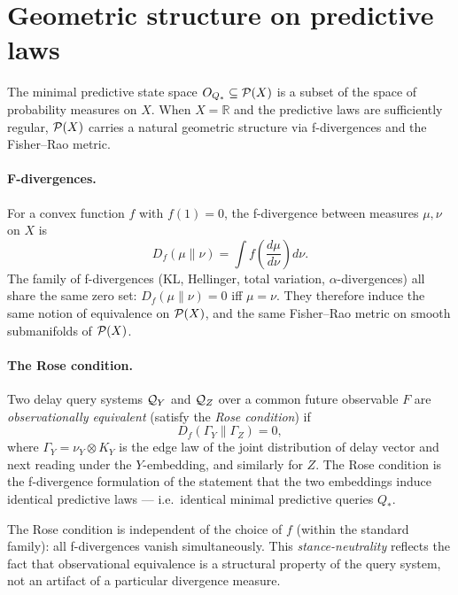 \section{Geometric structure on predictive laws}\label{sec:geometry}

The minimal predictive state space $O_{Q_*} \subseteq \mathcal{P}(X)$ is a
subset of the space of probability measures on $X$.  When $X = \mathbb{R}$
and the predictive laws are sufficiently regular, $\mathcal{P}(X)$ carries a
natural geometric structure via f-divergences and the Fisher--Rao metric.

\paragraph{F-divergences.}
For a convex function $f$ with $f(1) = 0$, the f-divergence between
measures $\mu, \nu$ on $X$ is
\[
  D_f(\mu \| \nu) = \int f\!\left(\frac{d\mu}{d\nu}\right) d\nu.
\]
The family of f-divergences (KL, Hellinger, total variation, $\alpha$-divergences)
all share the same zero set: $D_f(\mu \| \nu) = 0$ iff $\mu = \nu$.  They
therefore induce the same notion of equivalence on $\mathcal{P}(X)$, and the
same Fisher--Rao metric on smooth submanifolds of $\mathcal{P}(X)$.

\paragraph{The Rose condition.}
Two delay query systems $\mathcal{Q}_Y$ and $\mathcal{Q}_Z$ over a common future
observable $F$ are \emph{observationally equivalent} (satisfy the
\emph{Rose condition}) if
\[
  D_f(\Gamma_Y \| \Gamma_Z) = 0,
\]
where $\Gamma_Y = \nu_Y \otimes K_Y$ is the edge law of the joint
distribution of delay vector and next reading under the $Y$-embedding,
and similarly for $Z$.  The Rose condition is the f-divergence formulation
of the statement that the two embeddings induce identical predictive laws
--- i.e.\ identical minimal predictive queries $Q_*$.

\begin{remark}
The Rose condition is independent of the choice of $f$ (within the
standard family): all f-divergences vanish simultaneously.  This
\emph{stance-neutrality} reflects the fact that observational equivalence
is a structural property of the query system, not an artifact of a
particular divergence measure.
\end{remark}

